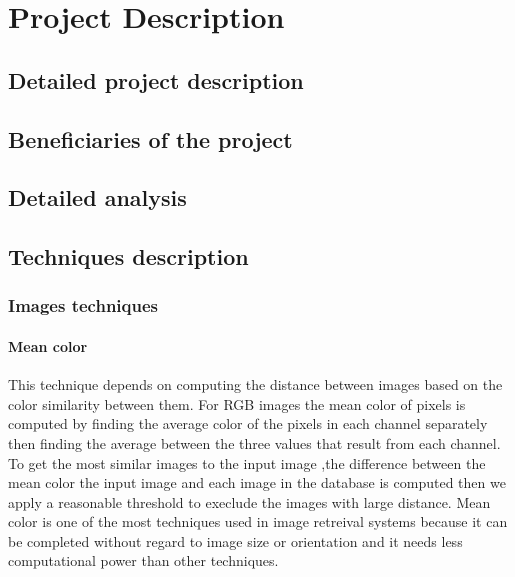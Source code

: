 \chapter{Project Description}
\section{Detailed project description}





\section{Beneficiaries of the project}





\section{Detailed analysis}




\section{Techniques description}
\subsection{Images techniques}

\subsubsection{Mean color}
This technique depends on computing the distance between images based on the color similarity between them. 
For RGB images the mean color of pixels is computed by finding the average color of the pixels in each channel 
separately then finding the average between the three
values that result from each channel. To get the most similar images to the input image ,the difference between the mean color the input image 
and each image in the database is computed then we apply a reasonable threshold to execlude the images with large distance.
\vskip 0.2in
Mean color is one of the most techniques used in image retreival systems 
because it can be completed without regard to image size or orientation and it needs less computational power than other techniques.


